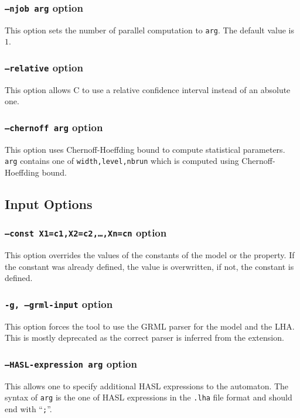 \documentclass{article}
\newcommand{\cosmos}{\mbox{\textup{C}\scalebox{0.75}{{\textsc{OSMOS}}}}}
\begin{document}
\subsubsection{\texttt{--njob arg}  option}
This option sets the number of parallel computation to \texttt{arg}.
The default value is $1$.

\subsubsection{\texttt{--relative}  option}
This option allows \cosmos{} to use a relative confidence interval
instead of an absolute one.

\subsubsection{\texttt{--chernoff arg}  option}
This option uses Chernoff-Hoeffding bound to compute statistical
parameters.  \texttt{arg} contains one of \texttt{width,level,nbrun}
which is computed using Chernoff-Hoeffding bound.

\subsection{Input Options}

\subsubsection{\texttt{--const X1=c1,X2=c2,\dots,Xn=cn}  option}
This option overrides the values of the constants of the model or the
property. If the constant was already defined, the value is
overwritten, if not, the constant is defined.

\subsubsection{\texttt{-g, --grml-input}  option}
This option forces the tool to use the GRML parser for the model and
the LHA. This is mostly deprecated as the correct parser is inferred
from the extension.

\subsubsection{\texttt{--HASL-expression arg}  option}
This allows one to specify additional HASL{} expressions to the automaton.
The syntax of \texttt{arg} is the one of HASL{} expressions in the
\texttt{.lha} file format and should end with ``\texttt{;}''.
\end{document}
